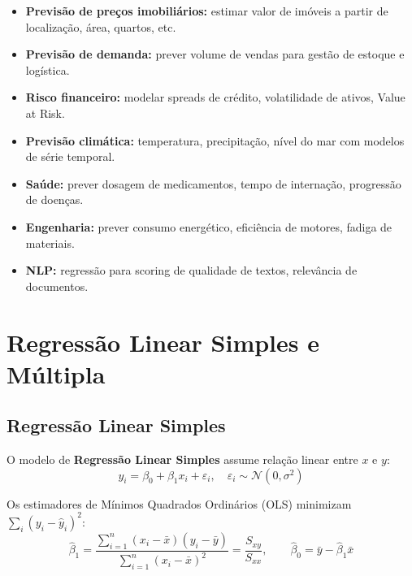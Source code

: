 \documentclass[12pt,a4paper]{article}
\begin{document}
\begin{itemize}
  \item {} \textbf{Previsão de preços imobiliários:} estimar valor de imóveis a partir de localização, área, quartos, etc.
  \item {} \textbf{Previsão de demanda:} prever volume de vendas para gestão de estoque e logística.
  \item {} \textbf{Risco financeiro:} modelar spreads de crédito, volatilidade de ativos, Value at Risk.
  \item {} \textbf{Previsão climática:} temperatura, precipitação, nível do mar com modelos de série temporal.
  \item {} \textbf{Saúde:} prever dosagem de medicamentos, tempo de internação, progressão de doenças.
  \item {} \textbf{Engenharia:} prever consumo energético, eficiência de motores, fadiga de materiais.
  \item {} \textbf{NLP:} regressão para scoring de qualidade de textos, relevância de documentos.
\end{itemize}

\section{Regressão Linear Simples e Múltipla}

\subsection{Regressão Linear Simples}

O modelo de \textbf{Regressão Linear Simples} assume relação linear entre $x$ e $y$:
\[
  y_i = \beta_0 + \beta_1 x_i + \varepsilon_i, \quad \varepsilon_i \sim \mathcal{N}(0, \sigma^2)
\]

Os estimadores de Mínimos Quadrados Ordinários (OLS) minimizam $\sum_i (y_i - \hat{y}_i)^2$:
\[
  \hat{\beta}_1 = \frac{\sum_{i=1}^n (x_i - \bar{x})(y_i - \bar{y})}{\sum_{i=1}^n (x_i - \bar{x})^2} = \frac{S_{xy}}{S_{xx}}, \qquad \hat{\beta}_0 = \bar{y} - \hat{\beta}_1 \bar{x}
\]
\end{document}
